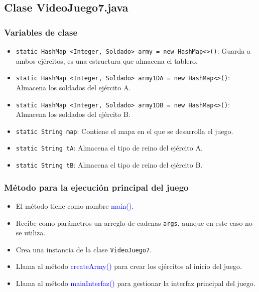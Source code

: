 \documentclass{article}
\begin{document}



\newpage %

\subsection{Clase VideoJuego7.java}

\subsubsection{Variables de clase}
\begin{itemize}
        \item \texttt{static HashMap <Integer, Soldado> army = new HashMap<>()}: Guarda a ambos ejércitos, es una estructura que almacena el tablero.
        \item \texttt{static HashMap <Integer, Soldado> army1DA = new HashMap<>()}: Almacena los soldados del ejército A.
        \item \texttt{static HashMap <Integer, Soldado> army1DB = new HashMap<>()}: Almacena los soldados del ejército B.
        \item \texttt{static String map}: Contiene el mapa en el que se desarrolla el juego.
        \item \texttt{static String tA}: Almacena el tipo de reino del ejército A.
        \item \texttt{static String tB}: Almacena el tipo de reino del ejército B.
\end{itemize}



\subsubsection{Método para la ejecución principal del juego}

\begin{itemize}
    \item El método tiene como nombre \textcolor{blue}{main()}.
    \item Recibe como parámetros un arreglo de cadenas \texttt{args}, aunque en este caso no se utiliza.
    \item Crea una instancia de la clase \texttt{VideoJuego7}.
    \item Llama al método \textcolor{blue}{createArmy()} para crear los ejércitos al inicio del juego.
    \item Llama al método \textcolor{blue}{mainInterfaz()} para gestionar la interfaz principal del juego.
\end{itemize}

\end{document}
